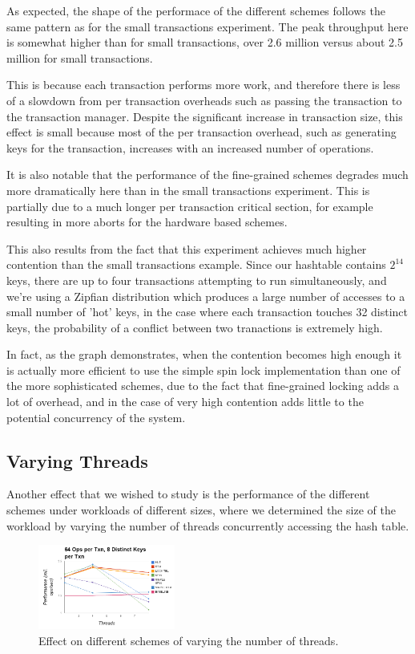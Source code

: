 As expected, the shape of the performace of the different schemes follows the 
same pattern as for the small transactions experiment. The peak throughput here 
is somewhat higher than for small transactions, over 2.6 million versus about 
2.5 million for small transactions.

This is because each transaction performs more work, and therefore there is less 
of a slowdown from per transaction overheads such as passing the transaction to 
the transaction manager. Despite the significant increase in transaction size, 
this effect is small because most of the per transaction overhead, such as 
generating keys for the transaction, increases with an increased number of 
operations.

It is also notable that the performance of the fine-grained schemes degrades 
much more dramatically here than in the small transactions experiment. This is 
partially due to a much longer per transaction critical section, for example resulting in 
more aborts for the hardware based schemes.

This also results from the fact that this experiment achieves much higher 
contention than the small transactions example. Since our hashtable contains $2^{14}$ 
keys, there are up to four transactions attempting to run simultaneously, and we're using 
a Zipfian distribution which produces a large number of accesses to a small number of 'hot' 
keys, in the case where each transaction touches 32 distinct keys, the probability of a 
conflict between two tranactions is extremely high.

In fact, as the graph demonstrates, when the contention becomes high enough it 
is actually more efficient to use the simple spin lock implementation than one of 
the more sophisticated schemes, due to the fact that fine-grained locking adds a lot 
of overhead, and in the case of very high contention adds little to the potential 
concurrency of the system.

\subsection{Varying Threads}

Another effect that we wished to study is the performance of the different schemes 
under workloads of different sizes, where we determined the size of the workload 
by varying the number of threads concurrently accessing the hash table.

\begin{figure}[h!]
  \centering
  \includegraphics[width=0.4\textwidth]{figure/threads.png}
  \caption{Effect on different schemes of varying the number of threads.}
  \label{fig:threads} 
\end{figure}

